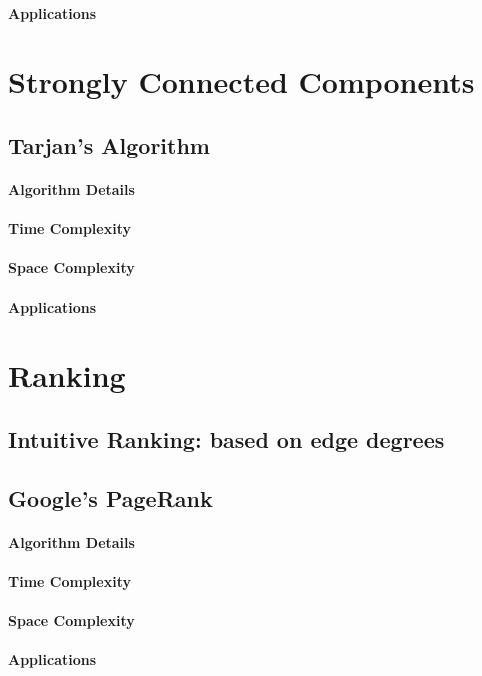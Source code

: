 \documentclass[12pt]{article}
\begin{document}
\paragraph{Applications}

\section{Strongly Connected Components}

\subsection{Tarjan's Algorithm}



\paragraph{Algorithm Details}
\paragraph{Time Complexity}
\paragraph{Space Complexity}
\paragraph{Applications}

\section{Ranking}

\subsection{Intuitive Ranking: based on edge degrees}



\subsection{Google's PageRank}

\paragraph{Algorithm Details}



\paragraph{Time Complexity}
\paragraph{Space Complexity}
\paragraph{Applications}
\end{document}
